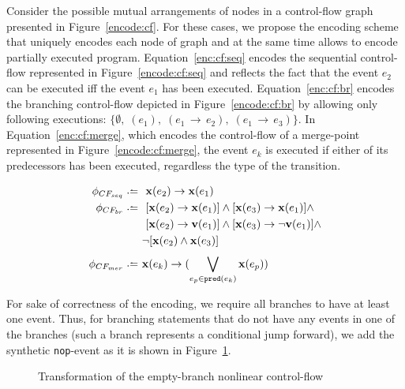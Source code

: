 Consider the possible mutual arrangements of nodes in a control-flow graph presented in Figure~\ref{encode:cf}.
For these cases, we propose the encoding scheme that uniquely encodes each node of graph and at the same time allows to encode partially executed program.
Equation~\ref{enc:cf:seq} encodes the sequential control-flow represented in Figure~\ref{encode:cf:seq} and reflects the fact that the event $e_2$ can be executed iff the event $e_1$ has been executed.
Equation~\ref{enc:cf:br} encodes the branching control-flow depicted in Figure~\ref{encode:cf:br} by allowing only following executions: $\{\emptyset, \; (e_1), \; (e_1\,\rightarrow\,e_2), \; (e_1\,\rightarrow\,e_3)\}$.
In Equation~\ref{enc:cf:merge}, which encodes the control-flow of a merge-point represented in Figure~\ref{encode:cf:merge}, the event $e_k$ is executed if either of its predecessors has been executed, regardless the type of the transition.

\begin{align}
\phi_{CF_{seq}}   \defeq \ & \ \fx(e_2) \rightarrow \fx(e_1) \label{enc:cf:seq} \\
\phi_{CF_{br}}    \defeq \ & \ [\fx(e_2) \rightarrow \fx(e_1)] \land [\fx(e_3) \rightarrow \fx(e_1)] \land \nonumber \\
                      & \ [\fx(e_2) \rightarrow \fv(e_1)] \land [\fx(e_3) \rightarrow \lnot\fv(e_1)] \land \nonumber \\
                      & \lnot [\fx(e_2) \land \fx(e_3)]  \label{enc:cf:br} \\
\phi_{CF_{mer}} \defeq \ & \fx(e_k) \rightarrow (\bigvee\limits_{e_p \in \mathtt{pred}(e_k)}^{} \fx(e_p)) \label{enc:cf:merge}
\end{align}


For sake of correctness of the encoding, we require all branches to have at least one event.
Thus, for branching statements that do not have any events in one of the branches (such a branch represents a conditional jump forward), we add the synthetic \texttt{nop}-event as it is shown in Figure~\ref{encode:branching:nop}.

\begin{figure}
    \centering
    \caption{Transformation of the empty-branch nonlinear control-flow}
    \label{encode:branching:nop}
\end{figure}


